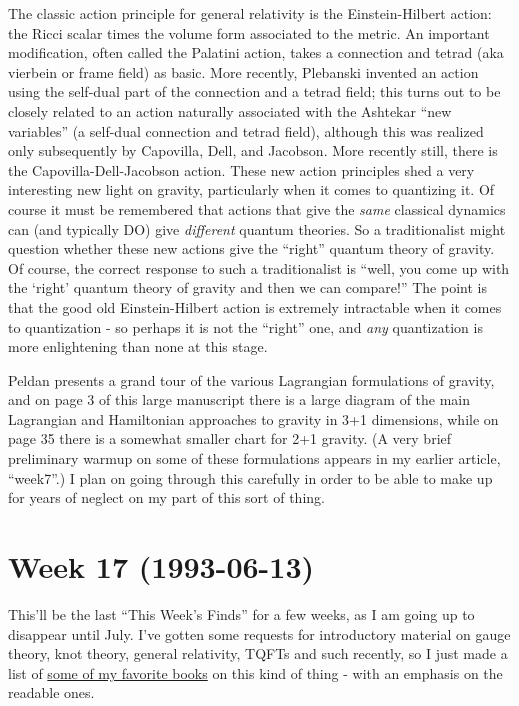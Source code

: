 \documentclass{article}
\begin{document}
The classic action principle for general relativity is the
Einstein-Hilbert action: the Ricci scalar times the volume form
associated to the metric. An important modification, often called the
Palatini action, takes a connection and tetrad (aka vierbein or frame
field) as basic. More recently, Plebanski invented an action using the
self-dual part of the connection and a tetrad field; this turns out to
be closely related to an action naturally associated with the Ashtekar
``new variables'' (a self-dual connection and tetrad field), although
this was realized only subsequently by Capovilla, Dell, and Jacobson.
More recently still, there is the Capovilla-Dell-Jacobson action. These
new action principles shed a very interesting new light on gravity,
particularly when it comes to quantizing it. Of course it must be
remembered that actions that give the \emph{same} classical dynamics can
(and typically DO) give \emph{different} quantum theories. So a
traditionalist might question whether these new actions give the
``right'' quantum theory of gravity. Of course, the correct response to
such a traditionalist is ``well, you come up with the `right' quantum
theory of gravity and then we can compare!'' The point is that the good
old Einstein-Hilbert action is extremely intractable when it comes to
quantization - so perhaps it is not the ``right'' one, and \emph{any}
quantization is more enlightening than none at this stage.

Peldan presents a grand tour of the various Lagrangian formulations of
gravity, and on page 3 of this large manuscript there is a large diagram
of the main Lagrangian and Hamiltonian approaches to gravity in 3+1
dimensions, while on page 35 there is a somewhat smaller chart for 2+1
gravity. (A very brief preliminary warmup on some of these formulations
appears in my earlier article, ``week7''.) I plan on going through this
carefully in order to be able to make up for years of neglect on my part
of this sort of thing.
\hypertarget{week-17-1993-06-13}{%
\section{Week 17 (1993-06-13)}\label{week-17-1993-06-13}}

This'll be the last ``This Week's Finds'' for a few weeks, as I am going
up to disappear until July. I've gotten some requests for introductory
material on gauge theory, knot theory, general relativity, TQFTs and
such recently, so I just made a list of
\href{http://math.ucr.edu/home/baez/books.html}{some of my favorite
books} on this kind of thing - with an emphasis on the readable ones.
\end{document}

